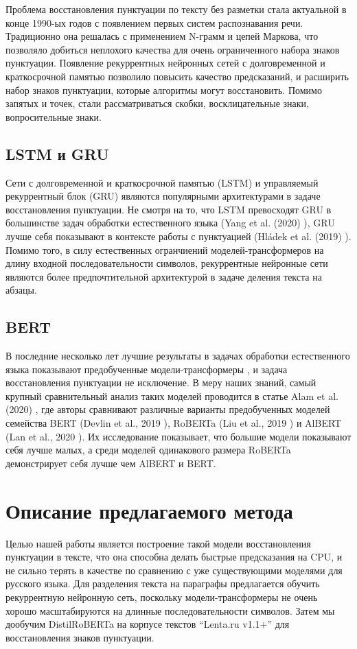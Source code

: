 \documentclass[a4paper,14pt]{extarticle}
\begin{document}
Проблема восстановления пунктуации по тексту без разметки стала актуальной в конце 1990-ых годов с появлением первых систем распознавания речи.
Традиционно она решалась с применением N-грамм и цепей Маркова, что позволяло добиться неплохого качества для очень ограниченного набора знаков пунктуации.
Появление рекуррентных нейронных сетей с долговременной и краткосрочной памятью позволило повысить качество предсказаний, и расширить набор знаков пунктуации, которые алгоритмы могут восстановить.
Помимо запятых и точек, стали рассматриваться скобки, восклицательные знаки, вопросительные знаки.

\subsection{LSTM и GRU}

Сети с долговременной и краткосрочной памятью (LSTM) и управляемый рекуррентный блок (GRU) являются популярными архитектурами в задаче восстановления пунктуации.
Не смотря на то, что LSTM превосходят GRU в большинстве задач обработки естественного языка (Yang et al. (2020) \cite{yang_lstm_2020}), GRU лучше себя показывают в контексте работы с пунктуацией (Hládek et al. (2019) \cite{hladek_comparison_2019}).
Помимо того, в силу естественных огранчиений моделей-трансформеров на длину входной последовательности символов, рекуррентные нейронные сети являются более предпочтительной архитектурой в задаче деления текста на абзацы.

\subsection{BERT}

В последние несколько лет лучшие результаты в задачах обработки естественного языка показывают предобученные модели-трансформеры \cite{vaswani_attention_2017}, и задача восстановления пунктуации не исключение.
В меру наших знаний, самый крупный сравнительный анализ таких моделей проводится в статье Alam et al. (2020) \cite{alam_punctuation_2020}, где авторы сравнивают различные варианты предобученных моделей семейства BERT (Devlin et al., 2019 \cite{devlin_no_2019}), RoBERTa (Liu et al., 2019 \cite{devlin_no_2019}) и AlBERT (Lan et al., 2020 \cite{chi_audio_2021}).
Их исследование показывает, что большие модели показывают себя лучше малых, а среди моделей одинакового размера RoBERTa демонстрирует себя лучше чем AlBERT и BERT.

\section{Описание предлагаемого метода}

Целью нашей работы является построение такой модели восстановления пунктуации в тексте, что она способна делать быстрые предсказания на CPU, и не сильно терять в качестве по сравнению с уже существующими моделями для русского языка.
Для разделения текста на параграфы предлагается обучить рекуррентную нейронную сеть, поскольку модели-трансформеры не очень хорошо масштабируются на длинные последовательности символов.
Затем мы дообучим DistilRoBERTa на корпусе текстов \enquote{Lenta.ru v1.1+} для восстановления знаков пунктуации.

\printbibliography
	
\end{document}
